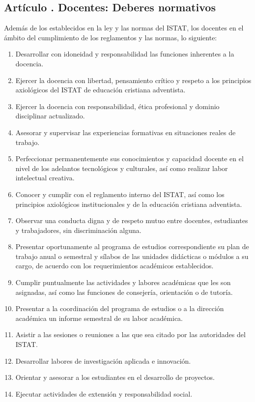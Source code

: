 \subsection{Artículo . Docentes: Deberes normativos}
\addtocounter{ns}{1}
Además de los establecidos en la ley y las normas del ISTAT, los docentes en el ámbito del cumplimiento de los reglamentos y las normas, lo siguiente: 
\begin{enumerate}
\item Desarrollar con idoneidad y responsabilidad las funciones inherentes a la docencia. 
\item Ejercer la docencia con libertad, pensamiento crítico y respeto a los principios axiológicos del ISTAT de educación cristiana adventista.
\item Ejercer la docencia con responsabilidad, ética profesional y dominio disciplinar actualizado.
\item Asesorar y supervisar las experiencias formativas en situaciones reales de trabajo.
\item Perfeccionar permanentemente sus conocimientos y capacidad docente en el nivel de los adelantos tecnológicos y culturales, así como realizar labor intelectual creativa.
\item Conocer y cumplir con el reglamento interno del ISTAT, así como los principios axiológicos institucionales y de la educación cristiana adventista.
\item Observar una conducta digna y de respeto mutuo entre docentes, estudiantes y trabajadores, sin discriminación alguna.
\item Presentar oportunamente al programa de estudios correspondiente su plan de trabajo anual o semestral y sílabos de las unidades didácticas o módulos a su cargo, de acuerdo con los requerimientos académicos establecidos.
\item Cumplir puntualmente las actividades y labores académicas que les son asignadas, así como las funciones de consejería, orientación o de tutoría.
\item Presentar a la coordinación del programa de estudios o a la dirección académica un informe semestral de su labor académica.
\item Asistir a las sesiones o reuniones a las que sea citado por las autoridades del ISTAT.
\item Desarrollar labores de investigación aplicada e innovación.
\item Orientar y asesorar a los estudiantes en el desarrollo de proyectos.
\item Ejecutar actividades de extensión y responsabilidad social.
\end{enumerate}
